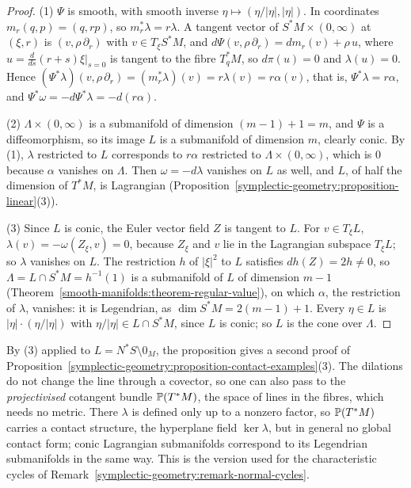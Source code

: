 \begin{proof}
(1) $\Psi$ is smooth, with smooth inverse $\eta \mapsto (\eta/|\eta|, |\eta|)$. In coordinates $m_r(q, p) = (q, rp)$, so $m_r^*\lambda = r\lambda$. A tangent vector of $S^*M \times (0, \infty)$ at $(\xi, r)$ is $(v, \rho\,\partial_r)$ with
$v \in T_\xi S^*M$, and $d\Psi(v, \rho\,\partial_r) = dm_r(v) + \rho\,u$, where $u = \frac{d}{ds}(r + s)\xi|_{s = 0}$ is tangent to the fibre $T^*_qM$, so $d\pi(u) = 0$ and $\lambda(u) = 0$. Hence
$(\Psi^*\lambda)(v, \rho\,\partial_r) = (m_r^*\lambda)(v) = r\lambda(v) = r\alpha(v)$, that is, $\Psi^*\lambda = r\alpha$, and $\Psi^*\omega = -d\Psi^*\lambda = -d(r\alpha)$.

(2) $\Lambda \times (0, \infty)$ is a submanifold of dimension $(m - 1) + 1 = m$, and $\Psi$ is a diffeomorphism, so its image $L$ is a submanifold of dimension $m$, clearly conic. By (1), $\lambda$ restricted to $L$
corresponds to $r\alpha$ restricted to $\Lambda \times (0, \infty)$, which is $0$ because $\alpha$ vanishes on $\Lambda$. Then $\omega = -d\lambda$ vanishes on $L$ as well, and $L$, of half the dimension of $T^*M$, is Lagrangian
(Proposition~\ref{symplectic-geometry:proposition-linear}(3)).

(3) Since $L$ is conic, the Euler vector field $Z$ is tangent to $L$. For $v \in T_\xi L$, $\lambda(v) = -\omega(Z_\xi, v) = 0$, because $Z_\xi$ and $v$ lie in the Lagrangian subspace $T_\xi L$; so $\lambda$ vanishes on $L$. The
restriction $h$ of $|\xi|^2$ to $L$ satisfies $dh(Z) = 2h \neq 0$, so $\Lambda = L \cap S^*M = h^{-1}(1)$ is a submanifold of $L$ of dimension $m - 1$ (Theorem~\ref{smooth-manifolds:theorem-regular-value}), on which $\alpha$, the
restriction of $\lambda$, vanishes: it is Legendrian, as $\dim S^*M = 2(m - 1) + 1$. Every $\eta \in L$ is $|\eta| \cdot (\eta/|\eta|)$ with $\eta/|\eta| \in L \cap S^*M$, since $L$ is conic; so $L$ is the cone over $\Lambda$.
\end{proof}

By (3) applied to $L = N^*S \setminus 0_M$, the proposition gives a second proof of Proposition~\ref{symplectic-geometry:proposition-contact-examples}(3). The dilations do not change the line through a covector, so one
can also pass to the \emph{projectivised} cotangent bundle $\mathbb{P}(T^*M)$, the space of lines in the fibres, which needs no metric. There $\lambda$ is defined only up to a nonzero factor, so $\mathbb{P}(T^*M)$ carries a contact
structure, the hyperplane field $\ker\lambda$, but in general no global contact form; conic Lagrangian submanifolds correspond to its Legendrian submanifolds in the same way. This is the version used for
the characteristic cycles of Remark~\ref{symplectic-geometry:remark-normal-cycles}.

